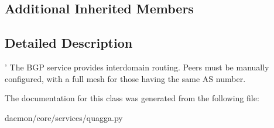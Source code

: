 \subsection*{Additional Inherited Members}


\subsection{Detailed Description}
\begin{DoxyVerb}' The BGP service provides interdomain routing.
    Peers must be manually configured, with a full mesh for those
    having the same AS number.
\end{DoxyVerb}
 

The documentation for this class was generated from the following file\+:\begin{DoxyCompactItemize}
\item 
daemon/core/services/quagga.\+py\end{DoxyCompactItemize}
